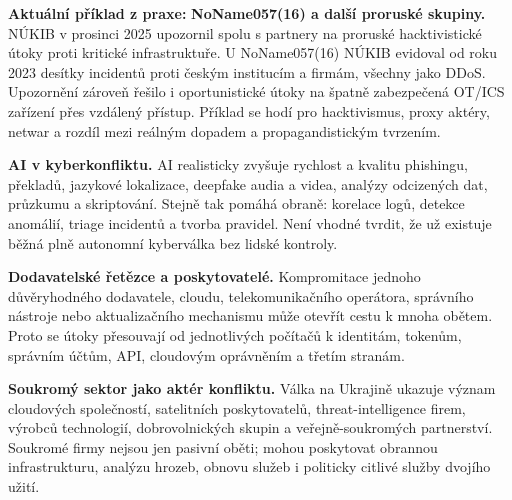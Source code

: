 \documentclass[11pt,a4paper]{article}
\newcommand{\aktualni}[1]{\begin{tcolorbox}[breakable,enhanced,colback=green!10,colframe=green!35!black,boxrule=0pt,arc=1mm,left=5pt,right=5pt,top=5pt,bottom=5pt,before skip=6pt,after skip=6pt]\textbf{Aktuální příklad z praxe:} #1\end{tcolorbox}}
\begin{document}
\aktualni{\textbf{NoName057(16) a další proruské skupiny.} NÚKIB v prosinci 2025 upozornil spolu s partnery na proruské hacktivistické útoky proti kritické infrastruktuře. U NoName057(16) NÚKIB evidoval od roku 2023 desítky incidentů proti českým institucím a firmám, všechny jako DDoS. Upozornění zároveň řešilo i oportunistické útoky na špatně zabezpečená OT/ICS zařízení přes vzdálený přístup. Příklad se hodí pro hacktivismus, proxy aktéry, netwar a rozdíl mezi reálným dopadem a propagandistickým tvrzením.}

\textbf{AI v kyberkonfliktu.} AI realisticky zvyšuje rychlost a kvalitu phishingu, překladů, jazykové lokalizace, deepfake audia a videa, analýzy odcizených dat, průzkumu a skriptování. Stejně tak pomáhá obraně: korelace logů, detekce anomálií, triage incidentů a tvorba pravidel. Není vhodné tvrdit, že už existuje běžná plně autonomní kyberválka bez lidské kontroly.

\textbf{Dodavatelské řetězce a poskytovatelé.} Kompromitace jednoho důvěryhodného dodavatele, cloudu, telekomunikačního operátora, správního nástroje nebo aktualizačního mechanismu může otevřít cestu k mnoha obětem. Proto se útoky přesouvají od jednotlivých počítačů k identitám, tokenům, správním účtům, API, cloudovým oprávněním a třetím stranám.

\textbf{Soukromý sektor jako aktér konfliktu.} Válka na Ukrajině ukazuje význam cloudových společností, satelitních poskytovatelů, threat-intelligence firem, výrobců technologií, dobrovolnických skupin a veřejně-soukromých partnerství. Soukromé firmy nejsou jen pasivní oběti; mohou poskytovat obrannou infrastrukturu, analýzu hrozeb, obnovu služeb i politicky citlivé služby dvojího užití.
\end{document}
